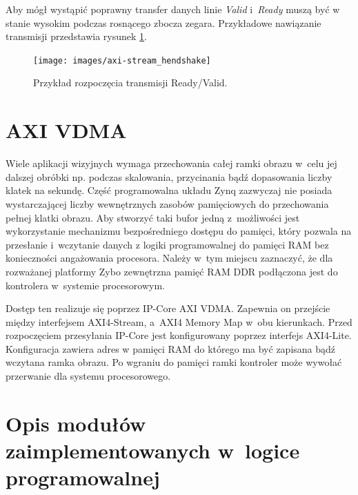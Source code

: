 Aby mógł wystąpić poprawny transfer danych linie \textit{Valid} i~\textit{Ready} muszą być w stanie wysokim podczas rosnącego zbocza zegara.
Przykładowe nawiązanie transmisji przedstawia rysunek \ref{fig:handshake}.

\begin{figure}[h]
\centering
\texttt{[image: images/axi-stream\_hendshake]}
\caption{Przykład rozpoczęcia transmisji Ready/Valid.}
\label{fig:handshake}
\end{figure}


\section{AXI VDMA}
Wiele aplikacji wizyjnych wymaga przechowania całej ramki obrazu w~celu jej dalszej obróbki np. podczas skalowania, przycinania bądź dopasowania liczby klatek na sekundę.
Część programowalna układu Zynq zazwyczaj nie posiada wystarczającej liczby wewnętrznych zasobów pamięciowych do przechowania pełnej klatki obrazu.
Aby stworzyć taki bufor jedną z~możliwości jest wykorzystanie mechanizmu bezpośredniego dostępu do pamięci, który pozwala na przesłanie i~wczytanie danych z logiki programowalnej do pamięci RAM bez konieczności angażowania procesora.
Należy w~tym miejscu zaznaczyć, że dla rozważanej platformy Zybo zewnętrzna pamięć RAM DDR podłączona jest do kontrolera w~systemie procesorowym.

Dostęp ten realizuje się poprzez IP-Core AXI VDMA.
Zapewnia on przejście między interfejsem AXI4-Stream, a~AXI4 Memory Map w~obu kierunkach.
Przed rozpoczęciem przesyłania IP-Core jest konfigurowany poprzez interfejs AXI4-Lite.
Konfiguracja zawiera adres w pamięci RAM do którego ma być zapisana bądź wczytana ramka obrazu.
Po wgraniu do pamięci ramki kontroler może wywołać przerwanie dla systemu procesorowego.

\section{Opis modułów zaimplementowanych w~logice programowalnej}

